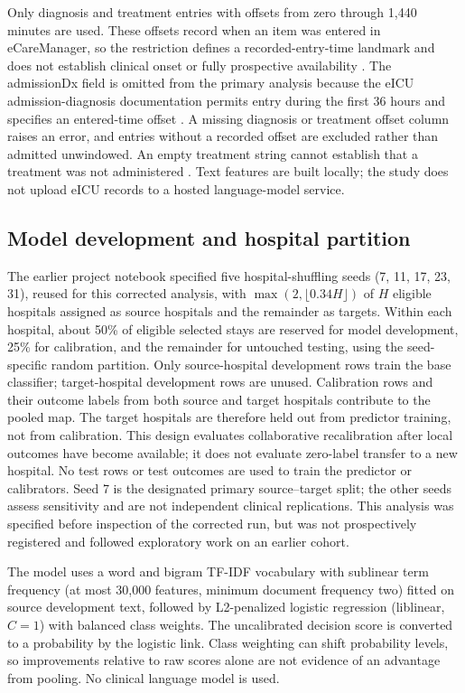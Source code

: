 \documentclass[11pt]{article}
\begin{document}
Only diagnosis and treatment entries with offsets from zero through 1,440 minutes are used. These offsets record when an item was entered in eCareManager, so the restriction defines a recorded-entry-time landmark and does not establish clinical onset or fully prospective availability \cite{r13,r14}. The admissionDx field is omitted from the primary analysis because the eICU admission-diagnosis documentation permits entry during the first 36 hours and specifies an entered-time offset \cite{r12}. A missing diagnosis or treatment offset column raises an error, and entries without a recorded offset are excluded rather than admitted unwindowed. An empty treatment string cannot establish that a treatment was not administered \cite{r14}. Text features are built locally; the study does not upload eICU records to a hosted language-model service.

\subsection*{Model development and hospital partition}\label{model-development-and-hospital-partition}

The earlier project notebook specified five hospital-shuffling seeds (7, 11, 17, 23, 31), reused for this corrected analysis, with $\max(2,\lfloor 0.34H\rfloor)$ of $H$ eligible hospitals assigned as source hospitals and the remainder as targets. Within each hospital, about 50\% of eligible selected stays are reserved for model development, 25\% for calibration, and the remainder for untouched testing, using the seed-specific random partition. Only source-hospital development rows train the base classifier; target-hospital development rows are unused. Calibration rows and their outcome labels from both source and target hospitals contribute to the pooled map. The target hospitals are therefore held out from predictor training, not from calibration. This design evaluates collaborative recalibration after local outcomes have become available; it does not evaluate zero-label transfer to a new hospital. No test rows or test outcomes are used to train the predictor or calibrators. Seed 7 is the designated primary source--target split; the other seeds assess sensitivity and are not independent clinical replications. This analysis was specified before inspection of the corrected run, but was not prospectively registered and followed exploratory work on an earlier cohort.

The model uses a word and bigram TF-IDF vocabulary with sublinear term frequency (at most 30,000 features, minimum document frequency two) fitted on source development text, followed by L2-penalized logistic regression (liblinear, $C=1$) with balanced class weights. The uncalibrated decision score is converted to a probability by the logistic link. Class weighting can shift probability levels, so improvements relative to raw scores alone are not evidence of an advantage from pooling. No clinical language model is used.
\end{document}
